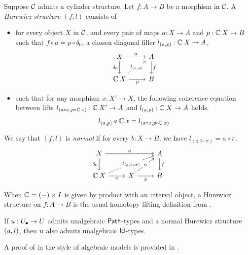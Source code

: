 \begin{definition}
  \label{def:hurewicz-defs}
  Suppose $\mathcal{C}$ admits a cylinder structure.
  Let $f : A \to B$ be a morphism in $\mathcal{C}$.
  A \emph{Hurewicz structure $(f,l)$} consists of
  \begin{itemize} 
    \item for every object $X$ in $\mathcal{C}$,
    and every pair of maps $a : X \to A$
    and $p : \mathop{\mathbb{C}_{}} X \to B$ such that
    $f \circ a = p \circ \delta_0$,
    a chosen diagonal filler $l_{(a,p)} : \mathop{\mathbb{C}_{}} X \to A$,
    \[\begin{tikzcd}
        X & A \\
        {\cyl X} & B
        \arrow["a", from=1-1, to=1-2]
        \arrow["\delta_0"', from=1-1, to=2-1]
        \arrow["f", from=1-2, to=2-2]
        \arrow["{l_{(a,p)}}"{description}, dashed, from=2-1, to=1-2]
        \arrow["p"', from=2-1, to=2-2]
      \end{tikzcd} \]
    \item such that for any morphism $x : X' \to X$,
    the following coherence equation between lifts
    $l_{(a \circ x,p \circ \mathop{\mathbb{C}_{}} x)} : \mathop{\mathbb{C}_{}} X' \to A$
    and $l_{(a,p)} : \mathop{\mathbb{C}_{}} X \to A$ holds.
    \[ l_{(a,p)} \circ \mathop{\mathbb{C}_{}} x = l_{(a \circ x,p \circ \mathop{\mathbb{C}_{}} x)} \]
  \end{itemize}

  We say that $(f,l)$ is \emph{normal} if
  for every $b : X \to B$, we have $l_{(a,b \circ \pi)} = a \circ \pi$. 
  \[\begin{tikzcd}
      X && A \\
      {\cyl X} & X & B
      \arrow["a", from=1-1, to=1-3]
      \arrow["{\delta_0}"', from=1-1, to=2-1]
      \arrow["f", from=1-3, to=2-3]
      \arrow["{l_{(a,b \circ \pi)}}"{description}, dashed, from=2-1, to=1-3]
      \arrow["\pi"', from=2-1, to=2-2]
      \arrow["a"{description}, from=2-2, to=1-3]
      \arrow["b"', from=2-2, to=2-3]
    \end{tikzcd}
    \]  
\end{definition}
When $\mathop{\mathbb{C}_{}} = (-) \times I$ is given by product with an interval object,
a Hurewicz structure on $f : A \to B$ is the usual homotopy lifting
definition from \cite{awodey2026}.

\begin{theorem}
  \label{thm:id-elim-2}
  If ${u} : {U_\bullet} \to U$ admits unalgebraic $\mathop{\mathsf{Path}}$-types
  and a normal Hurewicz structure $({u},l)$,
  then ${u}$ also admits unalgebraic $\mathsf{Id}$-types.
\end{theorem}
A proof of  in the style of algebraic models is provided in .

